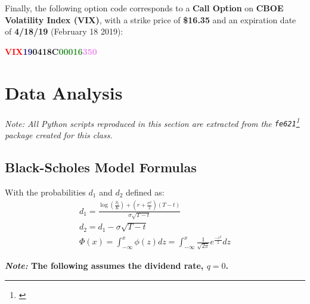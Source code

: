 \documentclass[10pt]{article}
\newcommand*\lstinputpath[1]{\lstset{inputpath=#1}} %
\begin{document}
        Finally, the following option code corresponds to a \textbf{Call Option} on \textbf{CBOE Volatility Index (VIX)}, with a strike price of \textbf{\$16.35} and an expiration date of \textbf{4/18/19} (February 18 2019):
    
        \begin{center}
            \textbf{\textcolor{red}{VIX}\textcolor{MidnightBlue}{19}\textcolor{Bittersweet}{04}\textcolor{YellowOrange}{18}\textcolor{RoyalPurple}{C}\textcolor{ForestGreen}{00016}\textcolor{violet}{350}}
        \end{center}



\newpage

\lstinputpath{..}

\section{Data Analysis}

    \begin{center}
        \textit{Note: All Python scripts reproduced in this section are extracted from the {\normalfont \texttt{fe621}}\footnote{\cite{Weerawarana2019}} package created for this class.}
    \end{center}

    \subsection{Black-Scholes Model Formulas}

    With the probabilities $d_1$ and $d_2$ defined as:
    \begin{gather*}
        d_1 = \frac{\log \left( \frac{S_t}{K} \right) + \left( r + \frac{\sigma^2}{2} \right) (T-t)}{\sigma \sqrt{T-t}} \\
        d_2 = d_1 - \sigma \sqrt{T-t} \\
        \Phi(x) = \int_{-\infty}^{x} \phi(z) dz = \int_{-\infty}^{x} \frac{1}{\sqrt{2\pi}} e^{\frac{-z^2}{2}} dz
    \end{gather*}

    

    \pagebreak[4]

    \begin{center}
        \textbf{\textit{Note:} The following assumes the dividend rate, $q = 0$.}
    \end{center}
\end{document}

